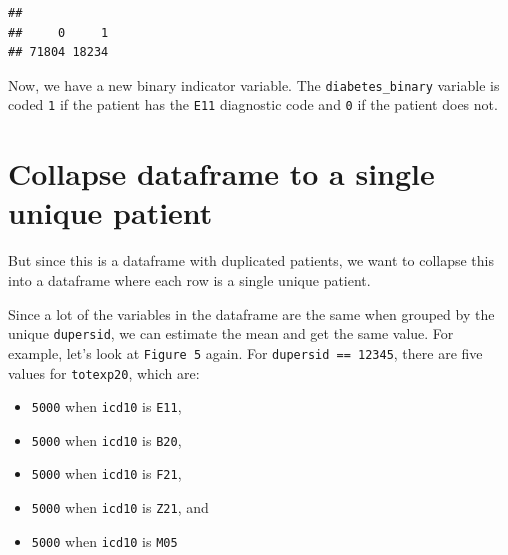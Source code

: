 \documentclass[
]{book}
\newenvironment{Shaded}{\begin{snugshade}}{\end{snugshade}}
\newcommand{\AttributeTok}[1]{\textcolor[rgb]{0.77,0.63,0.00}{#1}}
\newcommand{\ConstantTok}[1]{\textcolor[rgb]{0.00,0.00,0.00}{#1}}
\newcommand{\DecValTok}[1]{\textcolor[rgb]{0.00,0.00,0.81}{#1}}
\newcommand{\FunctionTok}[1]{\textcolor[rgb]{0.00,0.00,0.00}{#1}}
\newcommand{\NormalTok}[1]{#1}
\newcommand{\OtherTok}[1]{\textcolor[rgb]{0.56,0.35,0.01}{#1}}
\newcommand{\SpecialCharTok}[1]{\textcolor[rgb]{0.00,0.00,0.00}{#1}}
\theoremstyle{definition}
\theoremstyle{definition}
\theoremstyle{definition}
\theoremstyle{definition}
\theoremstyle{remark}
\begin{document}
\begin{Shaded}
\end{Shaded}

\begin{verbatim}
## 
##     0     1 
## 71804 18234
\end{verbatim}

Now, we have a new binary indicator variable. The \texttt{diabetes\_binary} variable is coded \texttt{1} if the patient has the \texttt{E11} diagnostic code and \texttt{0} if the patient does not.

\hypertarget{collapse-dataframe-to-a-single-unique-patient}{%
\section{Collapse dataframe to a single unique patient}\label{collapse-dataframe-to-a-single-unique-patient}}

But since this is a dataframe with duplicated patients, we want to collapse this into a dataframe where each row is a single unique patient.

Since a lot of the variables in the dataframe are the same when grouped by the unique \texttt{dupersid}, we can estimate the mean and get the same value. For example, let's look at \texttt{Figure\ 5} again. For \texttt{dupersid\ ==\ 12345}, there are five values for \texttt{totexp20}, which are:

\begin{itemize}
\item
  \texttt{5000} when \texttt{icd10} is \texttt{E11},
\item
  \texttt{5000} when \texttt{icd10} is \texttt{B20},
\item
  \texttt{5000} when \texttt{icd10} is \texttt{F21},
\item
  \texttt{5000} when \texttt{icd10} is \texttt{Z21}, and
\item
  \texttt{5000} when \texttt{icd10} is \texttt{M05}
\end{itemize}
\end{document}
